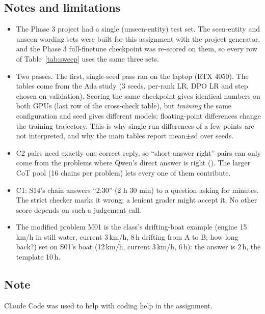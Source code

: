 

\subsection*{Notes and limitations}
\begin{itemize}[leftmargin=*,nosep]
\item The Phase 3 project had a single (unseen-entity) test set. The seen-entity and unseen-wording sets were built for this assignment with the project generator, and the Phase 3 full-finetune checkpoint was re-scored on them, so every row of Table~\ref{tab:sweep} uses the same three sets.
\item Two passes. The first, single-seed pass ran on the laptop (RTX 4050). The tables come from the Ada study (3 seeds, per-rank LR, DPO LR and step chosen on validation). Scoring the same checkpoint gives identical numbers on both GPUs (last row of the cross-check table), but \emph{training} the same configuration and seed gives different models: floating-point differences change the training trajectory. This is why single-run differences of a few points are not interpreted, and why the main tables report mean$\pm$sd over seeds.
\item C2 pairs need exactly one correct reply, so ``short answer right'' pairs can only come from the problems where Qwen's direct answer is right (\CTwoShortRightProblems). The larger CoT pool (16 chains per problem) lets every one of them contribute.
\item C1: S14's chain answers ``2:30'' (2 h 30 min) to a question asking for minutes. The strict checker marks it wrong; a lenient grader might accept it. No other score depends on such a judgement call.
\item The modified problem M01 is the class's drifting-boat example (engine 15\,km/h in still water, current 3\,km/h, 8\,h drifting from A to B; how long back?) set on S01's boat (12\,km/h, current 3\,km/h, 6\,h): the answer is 2\,h, the template 10\,h.
\end{itemize}

\subsection*{Note}
Claude Code was used to help with coding help in the assignment.
